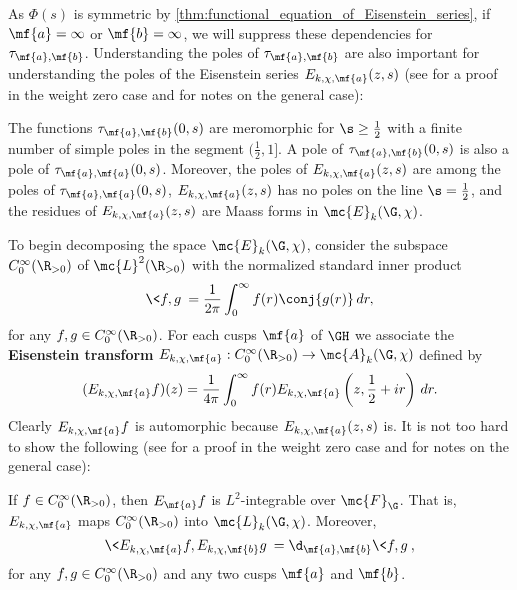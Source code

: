     As $\Phi(s)$ is symmetric by \cref{thm:functional_equation_of_Eisenstein_series}, if $\mf{a} = \infty$ or $\mf{b} = \infty$, we will suppress these dependencies for $\tau_{\mf{a},\mf{b}}$. Understanding the poles of $\tau_{\mf{a},\mf{b}}$ are also important for understanding the poles of the Eisenstein series $E_{k,\chi,\mf{a}}(z,s)$ (see \cite{iwaniec2002spectral} for a proof in the weight zero case and \cite{cohenmodular2017} for notes on the general case):

    \begin{theorem}\label{thm:residues_of_Eisenstein_series}
      The functions $\tau_{\mf{a},\mf{b}}(0,s)$ are meromorphic for $\s \ge \frac{1}{2}$ with a finite number of simple poles in the segment $(\frac{1}{2},1]$. A pole of $\tau_{\mf{a},\mf{b}}(0,s)$ is also a pole of $\tau_{\mf{a},\mf{a}}(0,s)$. Moreover, the poles of $E_{k,\chi,\mf{a}}(z,s)$ are among the poles of $\tau_{\mf{a},\mf{a}}(0,s)$, $E_{k,\chi,\mf{a}}(z,s)$ has no poles on the line $\s = \frac{1}{2}$, and the residues of $E_{k,\chi,\mf{a}}(z,s)$ are Maass forms in $\mc{E}_{k}(\G,\chi)$.
    \end{theorem}

    To begin decomposing the space $\mc{E}_{k}(\G,\chi)$, consider the subspace $C_{0}^{\infty}(\R_{> 0})$ of $\mc{L}^{2}(\R_{> 0})$ with the normalized standard inner product
    \[
      \<f,g\> = \frac{1}{2\pi}\int_{0}^{\infty}f(r)\conj{g(r)}\,dr,
    \]
    for any $f,g \in C_{0}^{\infty}(\R_{> 0})$. For each cusps $\mf{a}$ of $\GH$ we associate the \textbf{Eisenstein transform} $E_{k,\chi,\mf{a}}:C_{0}^{\infty}(\R_{> 0}) \to \mc{A}_{k}(\G,\chi)$ defined by
    \[
      (E_{k,\chi,\mf{a}}f)(z) = \frac{1}{4\pi}\int_{0}^{\infty}f(r)E_{k,\chi,\mf{a}}\left(z,\frac{1}{2}+ir\right)\,dr.
    \]
    Clearly $E_{k,\chi,\mf{a}}f$ is automorphic because $E_{k,\chi,\mf{a}}(z,s)$ is. It is not too hard to show the following (see \cite{iwaniec2002spectral} for a proof in the weight zero case and \cite{cohenmodular2017} for notes on the general case):

    \begin{proposition}\label{prop:Eisenstein_transform_property}
      If $f \in C_{0}^{\infty}(\R_{> 0})$, then $E_{\mf{a}}f$ is $L^{2}$-integrable over $\mc{F}_{\G}$. That is, $E_{k,\chi,\mf{a}}$ maps $C_{0}^{\infty}(\R_{> 0})$ into $\mc{L}_{k}(\G,\chi)$. Moreover,
      \[
        \<E_{k,\chi,\mf{a}}f,E_{k,\chi,\mf{b}}g\> = \d_{\mf{a},\mf{b}}\<f,g\>,
      \]
      for any $f,g \in C_{0}^{\infty}(\R_{> 0})$ and any two cusps $\mf{a}$ and $\mf{b}$.
    \end{proposition}


